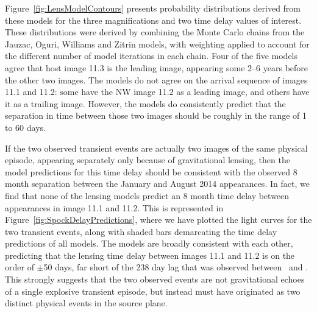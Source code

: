 Figure~\ref{fig:LensModelContours} presents probability distributions
derived from these models for the three magnifications and two time
delay values of interest.  These distributions were derived by
combining the Monte Carlo chains from the Jauzac, Oguri, Williams and
Zitrin models, with weighting applied to account for the different
number of model iterations in each chain. Four of the five models
agree that host image 11.3 is the leading image, appearing some 2--6
years before the other two images.  The models do not agree on the
arrival sequence of images 11.1 and 11.2: some have the NW image 11.2
as a leading image, and others have it as a trailing image.  However,
the models do consistently predict that the separation in time between
those two images should be roughly in the range of 1 to 60 days.

If the two observed transient events are actually two images of the
same physical episode, appearing separately only because of
gravitational lensing, then the model predictions for this time delay
should be consistent with the observed 8 month separation between the
January and August 2014 appearances.  In fact, we find that none of
the lensing models predict an 8 month time delay between appearances
in image 11.1 and 11.2.  This is represented in
Figure~\ref{fig:SpockDelayPredictions}, where we have plotted the
light curves for the two transient events, along with shaded bars
demarcating the time delay predictions of all models.  The models are
broadly consistent with each other, predicting that the lensing time
delay between images 11.1 and 11.2 is on the order of $\pm$50 days,
far short of the 238 day lag that was observed between \spockone\ and
\spocktwo.  This strongly suggests that the two observed events are not
gravitational echoes of a single explosive transient episode, but
instead must have originated as two distinct physical events in the
source plane.


% 
